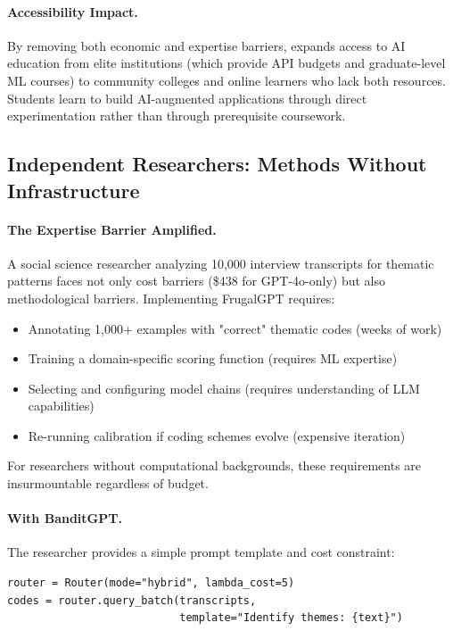 \paragraph{Accessibility Impact.} By removing both economic and expertise barriers, \ours{} expands access to AI education from elite institutions (which provide API budgets and graduate-level ML courses) to community colleges and online learners who lack both resources. Students learn to build AI-augmented applications through direct experimentation rather than through prerequisite coursework.

\subsection{Independent Researchers: Methods Without Infrastructure}

\paragraph{The Expertise Barrier Amplified.} A social science researcher analyzing 10,000 interview transcripts for thematic patterns faces not only cost barriers (\$438 for GPT-4o-only) but also methodological barriers. Implementing FrugalGPT requires:
\begin{itemize}[leftmargin=*,nosep]
    \item Annotating 1,000+ examples with "correct" thematic codes (weeks of work)
    \item Training a domain-specific scoring function (requires ML expertise)
    \item Selecting and configuring model chains (requires understanding of LLM capabilities)
    \item Re-running calibration if coding schemes evolve (expensive iteration)
\end{itemize}

For researchers without computational backgrounds, these requirements are insurmountable regardless of budget.

\paragraph{With BanditGPT.} The researcher provides a simple prompt template and cost constraint:

\begin{verbatim}
router = Router(mode="hybrid", lambda_cost=5)
codes = router.query_batch(transcripts, 
                           template="Identify themes: {text}")
\end{verbatim}

